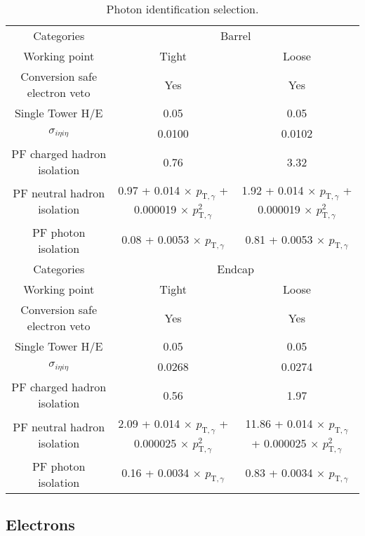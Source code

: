 \begin{table}[ht!]
  \caption{Photon identification selection.\label{tab:photon-id-gamma}}
  \centering
  \footnotesize
  \begin{tabular}{ ccc }
    \hline
    \hline
    Categories & \multicolumn{2}{c}{Barrel}   \\
    Working point  & Tight & Loose \\
    \hline
    Conversion safe electron veto & Yes & Yes  \\
    Single Tower H/E              & 0.05 & 0.05  \\
    $\sigma_{i\eta i\eta}$        & 0.0100 & 0.0102 \\
    PF charged hadron isolation   & 0.76 & 3.32  \\
    PF neutral hadron isolation   & 0.97 + 0.014 $\times$ $p_{\mathrm{T},\gamma}$ + 0.000019 $\times$ $p_{\mathrm{T},\gamma}^{2}$ & 1.92 + 0.014 $\times$ $p_{\mathrm{T},\gamma}$ + 0.000019 $\times$ $p_{\mathrm{T},\gamma}^{2}$  \\
    PF photon isolation           & 0.08 + 0.0053 $\times$ $p_{\mathrm{T},\gamma}$ & 0.81 + 0.0053 $\times$ $p_{\mathrm{T},\gamma}$ \\
    \hline
    \hline
    Categories & \multicolumn{2}{c}{Endcap}   \\
    Working point  & Tight & Loose \\
    \hline
    Conversion safe electron veto & Yes & Yes  \\
    Single Tower H/E              & 0.05 & 0.05  \\
    $\sigma_{i\eta i\eta}$        & 0.0268 & 0.0274 \\
    PF charged hadron isolation   & 0.56 & 1.97  \\
    PF neutral hadron isolation   & 2.09 + 0.014 $\times$ $p_{\mathrm{T},\gamma}$ + 0.000025 $\times$ $p_{\mathrm{T},\gamma}^{2}$ & 11.86 + 0.014 $\times$ $p_{\mathrm{T},\gamma}$ + 0.000025 $\times$ $p_{\mathrm{T},\gamma}^{2}$ \\
    PF photon isolation           &  0.16 + 0.0034 $\times$ $p_{\mathrm{T},\gamma}$ & 0.83 + 0.0034 $\times$ $p_{\mathrm{T},\gamma}$ \\
    \hline
    \hline
  \end{tabular}
  \end{table}

\subsection{Electrons}
\label{sec:electron-id}

